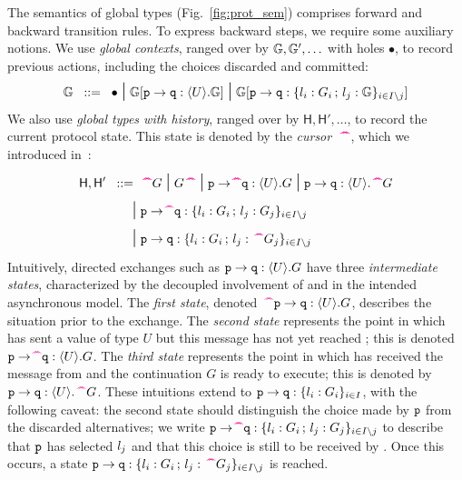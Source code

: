 \documentclass[runningheads]{llncs}
\begin{document}
The semantics of global types (Fig.~\ref{fig:prot_sem})
comprises forward and backward transition rules. 
To express backward steps, we require some auxiliary notions.
We use \emph{global contexts}, ranged over by $\mathbb{G}, \mathbb{G}', \ldots$ with holes $\bullet$,  to record
previous actions, including the choices discarded and committed:
$$
\mathbb{G}
\;\;::=\;\;   
\bullet 
\;\mbox{\Large{$\mid$}}\;  
\mathbb{G}[\mathtt{p}\to\mathtt{q}:\langle U\rangle.\mathbb{G}]
\;\mbox{\Large{$\mid$}}\;
\mathbb{G}[\mathtt{p}\to\mathtt{q}:\{l_i:G_i \,;\, l_j:\mathbb{G}\}_{i \in I\setminus j} ]
$$
We also use \emph{global types with history}, ranged over by $\mathsf{H}, \mathsf{H}', \ldots$, 
  to record the current protocol state. 
This state is denoted by the \emph{cursor}~$\,\textcolor{magenta}{\text{\textbf{\textasciicircum\!\!\textasciicircum}}}$, which we introduced in~\cite{DBLP:journals/corr/MezzinaP16}:
\begin{align*}
			\mathsf{H}, \mathsf{H}'  \bnfis & 			\past G \sbnfbar	G \past 
			\sbnfbar 
			\gtcom{p}{\!\!\past q}{U}{G} 
			\sbnfbar 
			\gtcom{p}{q}{U}{\past G} 
			\\\sbnfbar & 
			\gpart{p}\to\!\!\past\gpart{q}:\{\lbl_i:G_i \,;\, \lbl_j:G_j\}_{i \in I\setminus j} 
			\\ \sbnfbar & 
 			\gpart{p}\to\gpart{q}:\{\lbl_i:G_i \,;\, \lbl_j:\past G_j\}_{i \in I\setminus j}  
\end{align*}
Intuitively,  directed exchanges such as $\mathtt{p}\to\mathtt{q}:\langle U\rangle.G$ have three \emph{intermediate states},
characterized by the decoupled involvement of \p and \q in the intended asynchronous model.
The \emph{first state}, denoted $\,\textcolor{magenta}{\text{\textbf{\textasciicircum\!\!\textasciicircum}}} \mathtt{p}\to\mathtt{q}:\langle U\rangle.G$, describes the situation prior to the exchange.
The \emph{second state} represents the point in which \p has sent a value of type $U$ but this message has not yet
reached \q; this is denoted $\mathtt{p}\to\mathtt{\!\!\,\textcolor{magenta}{\text{\textbf{\textasciicircum\!\!\textasciicircum}}} q}:\langle U\rangle.G$.
The \emph{third state} represents the point in which \q has received the message from \p and
the continuation $G$ is ready to execute; this is denoted by $\mathtt{p}\to\mathtt{q}:\langle U\rangle.\,\textcolor{magenta}{\text{\textbf{\textasciicircum\!\!\textasciicircum}}} G$.
These intuitions extend to $\mathtt{p}\to\mathtt{q}:\{l_i:G_i\}_{i \in I}$, with the following caveat:
the second state should distinguish the choice made by $\mathtt{p}$ from the discarded alternatives; 
  we write $\mathtt{p}\to\!\!\,\textcolor{magenta}{\text{\textbf{\textasciicircum\!\!\textasciicircum}}}\mathtt{q}:\{l_i:G_i \,;\, l_j:G_j\}_{i \in I\setminus j}$ to describe that $\mathtt{p}$ has selected $l_j$ and that this choice is still to be received by \q. Once this occurs, a state
  $\mathtt{p}\to\mathtt{q}:\{l_i:G_i \,;\, l_j:\,\textcolor{magenta}{\text{\textbf{\textasciicircum\!\!\textasciicircum}}} G_j\}_{i \in I\setminus j}$ is reached.
\end{document}

